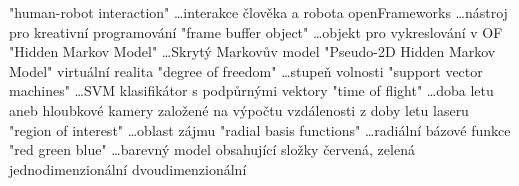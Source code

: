 
\abbrv[HRI]	"human-robot interaction" \dots interakce člověka a robota
\abbrv[OF]	openFrameworks \dots nástroj pro kreativní programování
\abbrv[FBO]  "frame buffer object" \dots objekt pro vykreslování v OF
\abbrv[HMM]  "Hidden Markov Model" \dots Skrytý Markovův model
\abbrv[P2DHMM]  "Pseudo-2D Hidden Markov Model"
\abbrv[VR]  virtuální realita
\abbrv[DOF]  "degree of freedom" \dots stupeň volnosti
\abbrv[SVM]  "support vector machines" \dots SVM klasifikátor s podpůrnými vektory
\abbrv[TOF]  "time of flight" \dots doba letu aneb hloubkové kamery založené na výpočtu vzdálenosti z doby letu laseru
\abbrv[ROI]  "region of interest" \dots oblast zájmu
\abbrv[RBF]  "radial basis functions" \dots radiální bázové funkce
\abbrv[RGB]  "red green blue" \dots barevný model obsahující složky červená, zelená 
\abbrv[1D]   jednodimenzionální
\abbrv[2D]   dvoudimenzionální

\stopAbbreviations

\endinput
